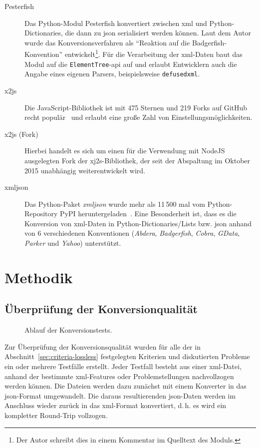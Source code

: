 \begin{description}
    \item[Pesterfish] Das Python-Modul Pesterfish konvertiert zwischen \acrshort{xml} und Python-\linebreak{}Dictionaries, die dann zu \acrshort{json} serialisiert werden können. Laut dem Autor wurde das Konversionsverfahren als \enquote{Reaktion auf die Badgerfish-Konvention} entwickelt\footnote{Der Autor schreibt dies in einem Kommentar im Quelltext des Moduls.}. Für die Verarbeitung der \acrshort{xml}-Daten baut das Modul auf die \texttt{ElementTree}-\acrshort{api} auf und erlaubt Entwicklern auch die Angabe eines eigenen Parsers, beispielsweise \texttt{defusedxml}.
    \item[x2js] Die JavaScript-Bibliothek ist mit 475 Sternen und 219 Forks auf GitHub recht populär~\cite{githubx2js} und erlaubt eine große Zahl von Einstellungsmöglichkeiten.
    \item[x2js (Fork)] Hierbei handelt es sich um einen für die Verwendung mit NodeJS ausgelegten Fork der xj2s-Bibliothek, der seit der Abspaltung im Oktober 2015 unabhängig weiterentwickelt wird.
    \item[xmljson] Das Python-Paket \emph{xmljson} wurde mehr als 11\,500 mal vom Python-Repository PyPI heruntergeladen~\cite{pypistats-xmljson}. Eine Besonderheit ist, dass es die Konversion von \acrshort{xml}-Daten in Python-Dictionaries/Lists bzw. \acrshort{json} anhand von 6 verschiedenen Konventionen (\emph{Abdera}, \emph{Badgerfish}, \emph{Cobra}, \emph{GData}, \emph{Parker} und \emph{Yahoo}) unterstützt.
\end{description}


\section{Methodik}
\label{sec:method}

\subsection{Überprüfung der Konversionqualität}
\label{sec:method-conv}

\begin{figure}[bp!]
    \begin{center}
        
        \caption{Ablauf der Konversionstests.}
    \end{center}
\end{figure}

Zur Überprüfung der Konversionsqualität wurden für alle der in Abschnitt~\ref{sec:criteria-lossless} festgelegten Kriterien und diskutierten Probleme ein oder mehrere Testfälle erstellt. Jeder Testfall besteht aus einer \acrshort{xml}-Datei, anhand der bestimmte \acrshort{xml}-Features oder Problemstellungen nachvollzogen werden können. Die Dateien werden dazu zunächst mit einem Konverter in das \acrshort{json}-Format umgewandelt. Die daraus resultierenden \acrshort{json}-Daten werden im Anschluss wieder zurück in das \acrshort{xml}-Format konvertiert, d.\,h. es wird ein kompletter Round-Trip vollzogen.

